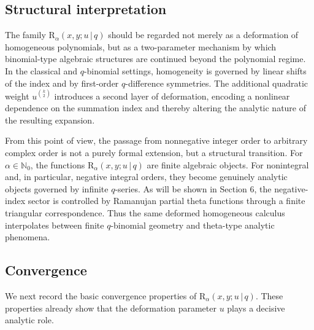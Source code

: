 \documentclass[12pt]{article}
\newcommand{\rr}{\mathrm{R}}
\begin{document}
\subsection{Structural interpretation}

The family \(\rr_{\alpha}(x,y;u\,|\,q)\) should be regarded not merely as a deformation of homogeneous polynomials, but as a two-parameter mechanism by which binomial-type algebraic structures are continued beyond the polynomial regime. In the classical and \(q\)-binomial settings, homogeneity is governed by linear shifts of the index and by first-order \(q\)-difference symmetries. The additional quadratic weight \(u^{\binom{k}{2}}\) introduces a second layer of deformation, encoding a nonlinear dependence on the summation index and thereby altering the analytic nature of the resulting expansion.

From this point of view, the passage from nonnegative integer order to
arbitrary complex order is not a purely formal extension, but a structural
transition. For \(\alpha\in\mathbb{N}_0\), the functions
\(\rr_{\alpha}(x,y;u\,|\,q)\) are finite algebraic objects. For nonintegral and,
in particular, negative integral orders, they become genuinely analytic
objects governed by infinite \(q\)-series. As will be shown in Section 6,
the negative-index sector is controlled by Ramanujan partial theta
functions through a finite triangular correspondence. Thus the same
deformed homogeneous calculus interpolates between finite \(q\)-binomial
geometry and theta-type analytic phenomena.

\subsection{Convergence}

We next record the basic convergence properties of
\(\rr_{\alpha}(x,y;u\,|\,q)\). These properties already show that the
deformation parameter \(u\) plays a decisive analytic role.
\end{document}
